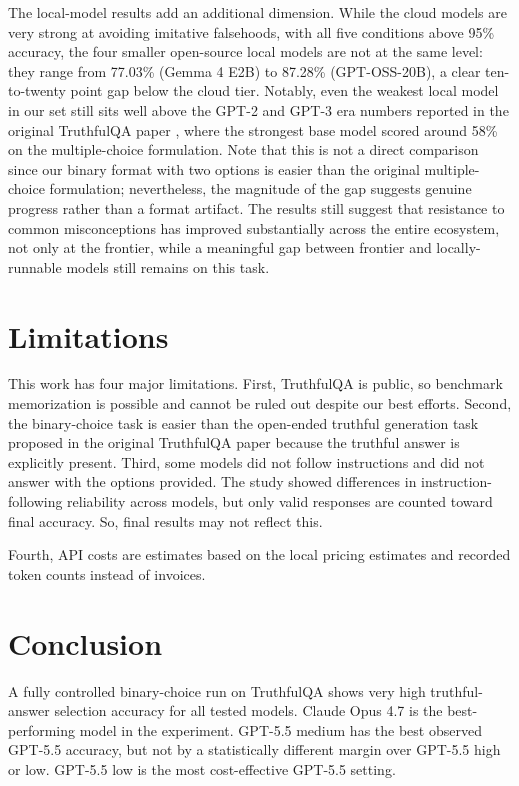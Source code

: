 \documentclass[11pt]{article}
\begin{document}
The local-model results add an additional dimension. While the cloud models are
very strong at avoiding imitative falsehoods, with all five conditions above
95\% accuracy, the four smaller open-source local models are not at the same
level: they range from 77.03\% (Gemma 4 E2B) to 87.28\% (GPT-OSS-20B), a clear
ten-to-twenty point gap below the cloud tier. Notably, even the weakest local
model in our set still sits well above the GPT-2 and GPT-3 era numbers reported
in the original TruthfulQA paper \citep{lin2022truthfulqameasuringmodelsmimic},
where the strongest base model scored around 58\% on the multiple-choice
formulation. Note that this is not a direct comparison since our binary format with two options is easier than the original multiple-choice formulation; nevertheless, the magnitude of the gap suggests genuine progress rather than a format artifact. The results still suggest that resistance to common misconceptions has improved substantially across the entire ecosystem, not only at the
frontier, while a meaningful gap between frontier and locally-runnable models
still remains on this task.

\section*{Limitations}
This work has four major limitations. First, TruthfulQA is public, so benchmark
memorization is possible and cannot be ruled out despite our best efforts. Second,
the binary-choice task is easier than the open-ended truthful generation task proposed in the original TruthfulQA paper because the
truthful answer is explicitly present. Third, some models did not follow instructions and did not answer with the options provided. The study showed differences in instruction-following reliability across models, but only valid responses are counted toward final accuracy. So, final results may not reflect this.

Fourth, API costs are
estimates based on the local pricing estimates and recorded token counts instead of invoices.

\section{Conclusion}
A fully controlled binary-choice run on TruthfulQA shows very high truthful-answer
selection accuracy for all tested models. Claude Opus 4.7 is
the best-performing model in the experiment. GPT-5.5 medium has the best observed GPT-5.5
accuracy, but not by a statistically different margin over GPT-5.5 high or low.
GPT-5.5 low is the most cost-effective GPT-5.5 setting. 
\end{document}
